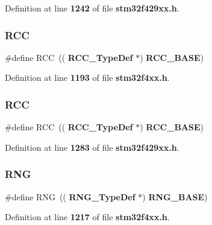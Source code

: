 Definition at line \textbf{ 1242} of file \textbf{ stm32f429xx.\+h}.

\mbox{\label{group__Peripheral__declaration_ga74944438a086975793d26ae48d5882d4}} 
\subsubsection{R\+CC\hspace{0.1cm}{\footnotesize\ttfamily [1/2]}}
{\footnotesize\ttfamily \#define R\+CC~((\textbf{ R\+C\+C\+\_\+\+Type\+Def} $\ast$) \textbf{ R\+C\+C\+\_\+\+B\+A\+SE})}



Definition at line \textbf{ 1193} of file \textbf{ stm32f4xx.\+h}.

\mbox{\label{group__Peripheral__declaration_ga74944438a086975793d26ae48d5882d4}} 
\subsubsection{R\+CC\hspace{0.1cm}{\footnotesize\ttfamily [2/2]}}
{\footnotesize\ttfamily \#define R\+CC~((\textbf{ R\+C\+C\+\_\+\+Type\+Def} $\ast$) \textbf{ R\+C\+C\+\_\+\+B\+A\+SE})}



Definition at line \textbf{ 1283} of file \textbf{ stm32f429xx.\+h}.

\mbox{\label{group__Peripheral__declaration_ga5b0885b8b55bbc13691092b704d9309f}} 
\subsubsection{R\+NG\hspace{0.1cm}{\footnotesize\ttfamily [1/2]}}
{\footnotesize\ttfamily \#define R\+NG~((\textbf{ R\+N\+G\+\_\+\+Type\+Def} $\ast$) \textbf{ R\+N\+G\+\_\+\+B\+A\+SE})}



Definition at line \textbf{ 1217} of file \textbf{ stm32f4xx.\+h}.

\mbox{\label{group__Peripheral__declaration_ga5b0885b8b55bbc13691092b704d9309f}} 
